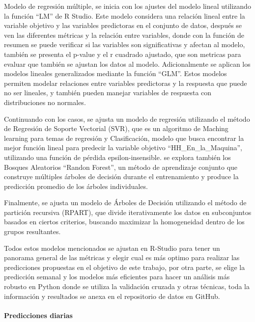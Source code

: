\documentclass[
  11pt,
  bookmarksnumbered]{article}
\begin{document}
Modelo de regresión múltiple, se inicia con los ajustes del modelo lineal utilizando la función ``LM'' de R Studio.
Este modelo considera una relación lineal entre la variable objetivo y las variables predictoras en el conjunto de datos, después se ven las diferentes métricas y la relación entre variables, donde con la función de resumen se puede verificar si las variables son significativas y afectan al modelo, también se presenta el p-value y el r cuadrado ajustado, que son metricas para evaluar que también se ajustan los datos al modelo.
Adicionalmente se aplican los modelos lineales generalizados mediante la función ``GLM''.
Estos modelos permiten modelar relaciones entre variables predictoras y la respuesta que puede no ser lineales, y también pueden manejar variables de respuesta con distribuciones no normales.

Continuando con los casos, se ajusta un modelo de regresión utilizando el método de Regresión de Soporte Vectorial (SVR), que es un algoritmo de Maching learning para temas de regresión y Clasificación, modelo que busca encontrar la mejor función lineal para predecir la variable objetivo ``HH\_En\_la\_Maquina'', utilizando una función de pérdida epsilon-insensible.
se explora también los Bosques Aleatorios ``Randon Forest'', un método de aprendizaje conjunto que construye múltiples árboles de decisión durante el entrenamiento y produce la predicción promedio de los árboles individuales.

Finalmente, se ajusta un modelo de Árboles de Decisión utilizando el método de partición recursiva (RPART), que divide iterativamente los datos en subconjuntos basados en ciertos criterios, buscando maximizar la homogeneidad dentro de los grupos resultantes.

Todos estos modelos mencionados se ajustan en R-Studio para tener un panorama general de las métricas y elegir cual es más optimo para realizar las predicciones propuestas en el objetivo de este trabajo, por otra parte, se elige la predicción semanal y los modelos más eficientes para hacer un análisis más robusto en Python donde se utiliza la validación cruzada y otras técnicas, toda la información y resultados se anexa en el repositorio de datos en GitHub.

\hypertarget{predicciones-diarias}{%
\paragraph{Predicciones diarias}\label{predicciones-diarias}}
\end{document}
